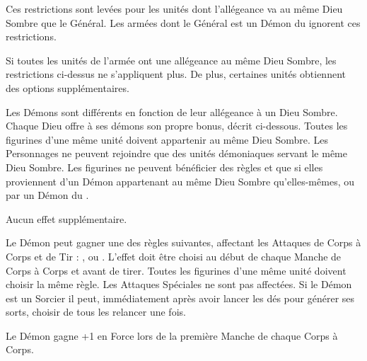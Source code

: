 Ces restrictions sont levées pour les unités dont l'allégeance va au même Dieu Sombre que le Général. Les armées dont le Général est un Démon du \truechaos{} ignorent ces restrictions.

\armyspecialruleentry{\monotheistarmybonus}

Si toutes les unités de l'armée ont une allégeance au même Dieu Sombre, les restrictions ci-dessus ne s'appliquent plus. De plus, certaines unités obtiennent des options supplémentaires.

\closearmywiderules









\newpage
\startarmyspecialrules

\armyspecialruleentry{\daemonofthedarkgods}

Les Démons sont différents en fonction de leur allégeance à un Dieu Sombre. Chaque Dieu offre à ses démons son propre bonus, décrit ci-dessous. Toutes les figurines d'une même unité doivent appartenir au même Dieu Sombre. Les Personnages ne peuvent rejoindre que des unités démoniaques servant le même Dieu Sombre. Les figurines ne peuvent bénéficier des règles \holdyourground{} et \inspiringpresence{} que si elles proviennent d'un Démon appartenant au même Dieu Sombre qu'elles-mêmes, ou par un Démon du \truechaos{}.

\spacebetweenalliance{}

\hfill{}
Aucun effet supplémentaire.
\allianceclosesidetext{}

\spacebetweenalliance{}

Le Démon peut gagner une des règles suivantes, affectant les Attaques de Corps à Corps et de Tir : \divineattacks{}, \flamingattacks{} ou \hellfire{}. L'effet doit être choisi au début de chaque Manche de Corps à Corps et avant de tirer. Toutes les figurines d'une même unité doivent choisir la même règle. Les Attaques Spéciales ne sont pas affectées. Si le Démon est un Sorcier il peut, immédiatement après avoir lancer les dés pour générer ses sorts, choisir de tous les relancer une fois.
\allianceclosesidetext{}\hfill
{}

\spacebetweenalliance{}

\hfill{}
Le Démon gagne +1 en Force lors de la première Manche de chaque Corps à Corps.
\allianceclosesidetext{}

